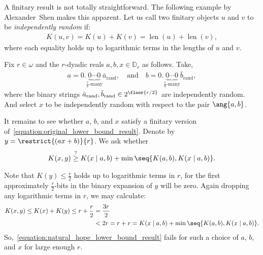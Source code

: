 A finitary result is not totally straightforward. The following example by Alexander~Shen makes this apparent. Let us call two finitary objects $u$ and $v$ to be \textit{independently random} if:
\begin{align*}
    K(u, v) = K(u) + K(v) = \operatorname{len}(u) + \operatorname{len}(v),
\end{align*}
where each equality holds up to logarithmic terms in the lengths of $u$ and $v$. 
\begin{example}
    Fix $r \in \omega$ and the $r$-dyadic reals $a, b, x \in \mathbb{D}_r$ as follows. Take,
    \begin{align*}
        a = 0.\underbrace{0\cdots 0}_{\frac{r}{2} \text{-many}} \bar{a}_{\text{rand}}, \quad \text{and} \quad b = 0.\underbrace{0\cdots 0}_{\frac{r}{2} \text{-many}} \bar{b}_{\text{rand}},
    \end{align*}
    where the binary strings $\bar{a}_{\text{rand}}, \bar{b}_{\text{rand}} \in 2^{\floor{r / 2}}$ are independently random. And select $x$ to be independently random with respect to the pair $\ang{a, b}$. 

    It remains to see whether $a$, $b$, and $x$ satisfy a finitary version of~\eqref{equation:original_lower_bound_result}. Denote by $y = \restrict{(ax + b)}{r}$. We ask whether
    \begin{align}
        \label{equation:natural_hope_lower_bound_result}
        K(x, y) \stackrel{?}{\geq} K(x \mid a, b) + \min \seq{K(a, b), K(x \mid a, b)}.
    \end{align}

    Note that $K(y) \leq \frac{r}{2}$ holds up to logarithmic terms in $r$, for the first approximately $\frac{r}{2}$-bits in the binary expansion of $y$ will be zero. Again dropping any logarithmic terms in $r$, we may calculate:
    \begin{align*}
        K(x, y) \leq K(x) + K(y) \leq r + \frac{r}{2} &= \frac{3r}{2}\\
        &< 2r = r + r = K(x \mid a, b) + \min \seq{K(a, b), K(x \mid a, b)}.        
    \end{align*}
    So,~\eqref{equation:natural_hope_lower_bound_result} fails for such a choice of $a$, $b$, and $x$ for large enough $r$.
\end{example}

